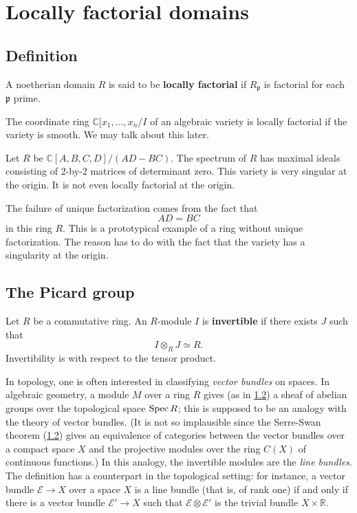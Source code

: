 \section{Locally factorial domains}

\subsection{Definition}
\begin{definition} 
A noetherian domain $R$ is said to be \textbf{locally factorial} if
$R_{\mathfrak{p}}$ is factorial for each $\mathfrak{p}$ prime.
\end{definition} 

\begin{example} 
The coordinate ring $\mathbb{C}[x_1, \dots, x_n/I$ of an algebraic variety is
locally factorial if the variety is smooth. We may talk about this later. 
\end{example} 

\begin{example}[Nonexample]
Let $R$ be $\mathbb{C}[A,B,C,D]/(AD - BC)$. The spectrum of $R$ has maximal
ideals consisting of 2-by-2 matrices of determinant zero. This variety is very
singular at the origin. It is not even locally factorial at the origin.

The failure of unique factorization comes from the fact that
\[ AD = BC  \]
in this ring $R$. This is a prototypical example of a ring without unique
factorization. The reason has to do with the fact that the variety has a
singularity at the origin. 
\end{example} 

\subsection{The Picard group}

\begin{definition} 
Let $R$ be a commutative ring. An $R$-module $I$ is \textbf{invertible} if
there exists $J$ such that
\[ I \otimes_R J \simeq R.  \]
Invertibility  is with respect to the tensor product.
\end{definition} 

\begin{remark} \label{linebundremark}
In topology, one is often interested in classifying \emph{vector bundles} on
spaces. In algebraic geometry, a module $M$ over a ring $R$ gives (as in
\cref{}) a sheaf of abelian groups over the topological space $\operatorname{Spec} R$; this
is supposed to be an analogy with the theory of vector bundles. (It is not so
implausible since the Serre-Swan theorem (\cref{}) gives an equivalence of
categories between the vector bundles over a compact space $X$ and the
projective modules over the ring $C(X)$ of continuous functions.) 
In this analogy, the invertible modules are the \emph{line bundles}.
The definition has a counterpart in the topological setting: for instance, a
vector bundle $\mathcal{E} \to X$ over a space $X$ is a line bundle (that is,
of rank one) if and only if there is a vector bundle $\mathcal{E}' \to X$ such
that $\mathcal{E} \otimes \mathcal{E}'$ is the trivial bundle $X \times
\mathbb{R}$.
\end{remark} 

